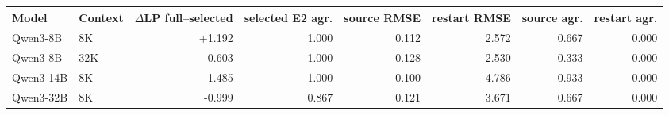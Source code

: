 \begin{tabular}{llrrrrrr}
\toprule
Model & Context & $\Delta$LP full--selected & selected E2 agr. & source RMSE & restart RMSE & source agr. & restart agr. \\
\midrule
Qwen3-8B & 8K & +1.192 & 1.000 & 0.112 & 2.572 & 0.667 & 0.000 \\
Qwen3-8B & 32K & -0.603 & 1.000 & 0.128 & 2.530 & 0.333 & 0.000 \\
Qwen3-14B & 8K & -1.485 & 1.000 & 0.100 & 4.786 & 0.933 & 0.000 \\
Qwen3-32B & 8K & -0.999 & 0.867 & 0.121 & 3.671 & 0.667 & 0.000 \\
\bottomrule
\end{tabular}
